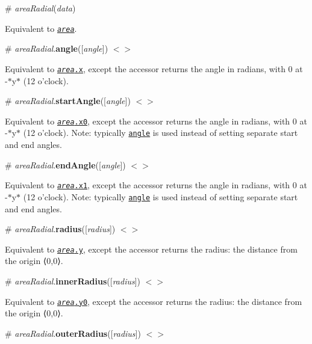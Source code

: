 \label{__areaRadial}%
\# {\itshape area\+Radial}({\itshape data})

Equivalent to \href{#_area}{\tt {\itshape area}}.

\label{_areaRadial_angle}%
\# {\itshape area\+Radial}.{\bfseries angle}(\mbox{[}{\itshape angle}\mbox{]}) \href{https://github.com/d3/d3-shape/blob/master/src/areaRadial.js#L13}{\tt $<$$>$}

Equivalent to \href{#area_x}{\tt {\itshape area}.x}, except the accessor returns the angle in radians, with 0 at -\/$\ast$y$\ast$ (12 o’clock).

\label{_areaRadial_startAngle}%
\# {\itshape area\+Radial}.{\bfseries start\+Angle}(\mbox{[}{\itshape angle}\mbox{]}) \href{https://github.com/d3/d3-shape/blob/master/src/areaRadial.js#L14}{\tt $<$$>$}

Equivalent to \href{#area_x0}{\tt {\itshape area}.x0}, except the accessor returns the angle in radians, with 0 at -\/$\ast$y$\ast$ (12 o’clock). Note\+: typically \href{#areaRadial_angle}{\tt angle} is used instead of setting separate start and end angles.

\label{_areaRadial_endAngle}%
\# {\itshape area\+Radial}.{\bfseries end\+Angle}(\mbox{[}{\itshape angle}\mbox{]}) \href{https://github.com/d3/d3-shape/blob/master/src/areaRadial.js#L15}{\tt $<$$>$}

Equivalent to \href{#area_x1}{\tt {\itshape area}.x1}, except the accessor returns the angle in radians, with 0 at -\/$\ast$y$\ast$ (12 o’clock). Note\+: typically \href{#areaRadial_angle}{\tt angle} is used instead of setting separate start and end angles.

\label{_areaRadial_radius}%
\# {\itshape area\+Radial}.{\bfseries radius}(\mbox{[}{\itshape radius}\mbox{]}) \href{https://github.com/d3/d3-shape/blob/master/src/areaRadial.js#L16}{\tt $<$$>$}

Equivalent to \href{#area_y}{\tt {\itshape area}.y}, except the accessor returns the radius\+: the distance from the origin ⟨0,0⟩.

\label{_areaRadial_innerRadius}%
\# {\itshape area\+Radial}.{\bfseries inner\+Radius}(\mbox{[}{\itshape radius}\mbox{]}) \href{https://github.com/d3/d3-shape/blob/master/src/areaRadial.js#L17}{\tt $<$$>$}

Equivalent to \href{#area_y0}{\tt {\itshape area}.y0}, except the accessor returns the radius\+: the distance from the origin ⟨0,0⟩.

\label{_areaRadial_outerRadius}%
\# {\itshape area\+Radial}.{\bfseries outer\+Radius}(\mbox{[}{\itshape radius}\mbox{]}) \href{https://github.com/d3/d3-shape/blob/master/src/areaRadial.js#L18}{\tt $<$$>$}

